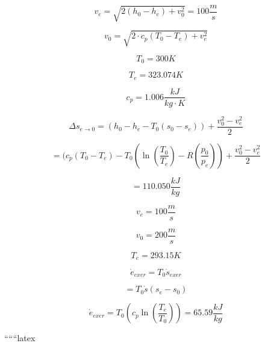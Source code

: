 \[
v_e = \sqrt{2 \left( h_0 - h_e \right) + v_0^2} = 100 \frac{m}{s}
\]

\[
v_0 = \sqrt{2 \cdot c_p (T_0 - T_e) + v_e^2}
\]

\[
T_0 = 300 K
\]

\[
T_e = 323.074 K
\]

\[
c_p = 1.006 \frac{kJ}{kg \cdot K}
\]

\[
\Delta s_{e \rightarrow 0} = (h_0 - h_e - T_0 (s_0 - s_e)) + \frac{v_0^2 - v_e^2}{2}
\]

\[
= (c_p (T_0 - T_e) - T_0 (\ln \left( \frac{T_0}{T_e} \right) - R \left( \frac{p_0}{p_e} \right)) + \frac{v_0^2 - v_e^2}{2}
\]

\[
= 110.050 \frac{kJ}{kg}
\]

\[
v_e = 100 \frac{m}{s}
\]

\[
v_0 = 200 \frac{m}{s}
\]

\[
T_e = 293.15 K
\]

\[
\dot{e}_{exer} = T_0 \dot{s}_{exer}
\]

\[
= T_0 \dot{s} (s_e - s_0)
\]

\[
\dot{e}_{exer} = T_0 \left( c_p \ln \left( \frac{T_e}{T_0} \right) \right) = 65.59 \frac{kJ}{kg}
\]

``````latex


